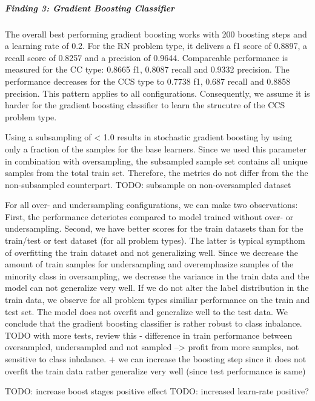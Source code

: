 \subparagraph{Finding 3: Gradient Boosting Classifier}
The overall best performing gradient boosting works with 200 boosting steps and a learning rate of 0.2. For the RN problem type, it delivers a f1 score of 0.8897, a recall score of 0.8257 and a precision of 0.9644. Compareable performance is measured for the CC type: 0.8665 f1, 0.8087 recall and 0.9332 precision. The performance decreases for the CCS type to 0.7738 f1, 0.687 recall and 0.8858 precision. This pattern applies to all configurations. Consequently, we assume it is harder for the gradient boosting classifier to learn the strucutre of the CCS problem type. 

Using a subsampling of < 1.0 results in stochastic gradient boosting by using only a fraction of the samples for the base learners. Since we used this parameter in combination with oversampling, the subsampled sample set contains all unique samples from the total train set. Therefore, the metrics do not differ from the the non-subsampled counterpart. TODO: subsample on non-oversampled dataset

For all over- and undersampling configurations, we can make two observations: First, the performance deteriotes compared to model trained without over- or undersampling. Second, we have better scores for the train datasets than for the train/test or test dataset (for all problem types). The latter is typical sympthom of overfitting the train dataset and not generalizing well. Since we decrease the amount of train samples for undersampling and overemphasize samples of the minority class in oversampling, we decrease the variance in the train data and the model can not generalize very well. If we do not alter the label distribution in the train data, we observe for all problem types similiar performance on the train and test set. The model does not overfit and generalize well to the test data. We conclude that the gradient boosting classifier is rather robust to class inbalance. TODO with more tests, review this - difference in train performance between oversampled, undersampled and not sampled --> profit from more samples, not sensitive to class inbalance. + we can increase the boosting step since it does not overfit the train data rather generalize very well (since test performance is same)

TODO: increase boost stages positive effect
TODO: increased learn-rate positive?



